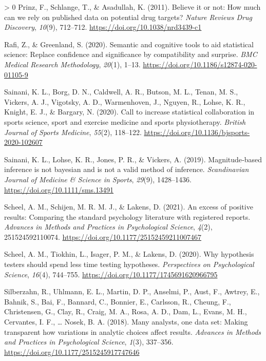 \documentclass[]{cik}%
\newlength{\cslhangindent}
\newenvironment{CSLReferences}[3] %
 {%
  \setlength{\parindent}{0pt}
  \ifodd #1 \everypar{\setlength{\hangindent}{\cslhangindent}}\ignorespaces\fi
  \ifnum #2 > 0
  \setlength{\parskip}{#2\baselineskip}
  \fi
 }%
 {}
\begin{document}
\begin{CSLReferences}{1}{0}
\leavevmode\hypertarget{ref-Prinz_Schlange_Asadullah_2011}{}%
Prinz, F., Schlange, T., \& Asadullah, K. (2011). Believe it or not: How
much can we rely on published data on potential drug targets?
\emph{Nature Reviews Drug Discovery}, \emph{10}(9), 712--712.
\url{https://doi.org/10.1038/nrd3439-c1}

\leavevmode\hypertarget{ref-rafi2020semantic}{}%
Rafi, Z., \& Greenland, S. (2020). Semantic and cognitive tools to aid
statistical science: Replace confidence and significance by
compatibility and surprise. \emph{BMC Medical Research Methodology},
\emph{20}(1), 1--13. \url{https://doi.org/10.1186/s12874-020-01105-9}

\leavevmode\hypertarget{ref-sainani2020}{}%
Sainani, K. L., Borg, D. N., Caldwell, A. R., Butson, M. L., Tenan, M.
S., Vickers, A. J., Vigotsky, A. D., Warmenhoven, J., Nguyen, R., Lohse,
K. R., Knight, E. J., \& Bargary, N. (2020). Call to increase
statistical collaboration in sports science, sport and exercise medicine
and sports physiotherapy. \emph{British Journal of Sports Medicine},
\emph{55}(2), 118--122.
\url{https://doi.org/10.1136/bjsports-2020-102607}

\leavevmode\hypertarget{ref-Sainani_Lohse_Jones_Vickers_2019}{}%
Sainani, K. L., Lohse, K. R., Jones, P. R., \& Vickers, A. (2019).
Magnitude‐based inference is not bayesian and is not a valid method of
inference. \emph{Scandinavian Journal of Medicine \& Science in Sports},
\emph{29}(9), 1428--1436. \url{https://doi.org/10.1111/sms.13491}

\leavevmode\hypertarget{ref-scheel_excess_2020}{}%
Scheel, A. M., Schijen, M. R. M. J., \& Lakens, D. (2021). An excess of
positive results: Comparing the standard psychology literature with
registered reports. \emph{Advances in Methods and Practices in
Psychological Science}, \emph{4}(2), 251524592110074.
\url{https://doi.org/10.1177/25152459211007467}

\leavevmode\hypertarget{ref-Scheel2020}{}%
Scheel, A. M., Tiokhin, L., Isager, P. M., \& Lakens, D. (2020). Why
hypothesis testers should spend less time testing hypotheses.
\emph{Perspectives on Psychological Science}, \emph{16}(4), 744--755.
\url{https://doi.org/10.1177/1745691620966795}

\leavevmode\hypertarget{ref-ManyAnalysts2018}{}%
Silberzahn, R., Uhlmann, E. L., Martin, D. P., Anselmi, P., Aust, F.,
Awtrey, E., Bahnik, S., Bai, F., Bannard, C., Bonnier, E., Carlsson, R.,
Cheung, F., Christensen, G., Clay, R., Craig, M. A., Rosa, A. D., Dam,
L., Evans, M. H., Cervantes, I. F., \ldots{} Nosek, B. A. (2018). Many
analysts, one data set: Making transparent how variations in analytic
choices affect results. \emph{Advances in Methods and Practices in
Psychological Science}, \emph{1}(3), 337--356.
\url{https://doi.org/10.1177/2515245917747646}


\end{CSLReferences}
\end{document}
